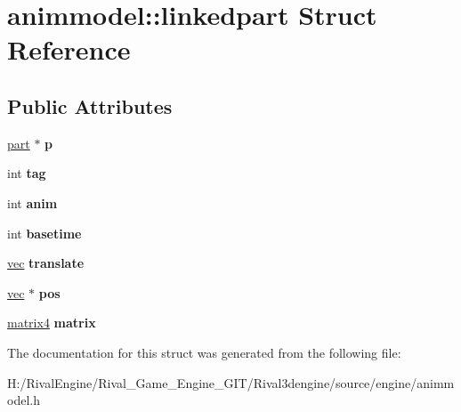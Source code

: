 \hypertarget{structanimmodel_1_1linkedpart}{}\section{animmodel\+:\+:linkedpart Struct Reference}
\label{structanimmodel_1_1linkedpart}
\subsection*{Public Attributes}
\begin{DoxyCompactItemize}
\item 
\mbox{\label{structanimmodel_1_1linkedpart_a5e61dc039b535c95bd657281d0ae76f2}} 
\hyperlink{structanimmodel_1_1part}{part} $\ast$ {\bfseries p}
\item 
\mbox{\label{structanimmodel_1_1linkedpart_a81c34c2f2b9e3b64faff64a4c9b67f8e}} 
int {\bfseries tag}
\item 
\mbox{\label{structanimmodel_1_1linkedpart_a2c4615fc73ec1401872b43f219c8e37c}} 
int {\bfseries anim}
\item 
\mbox{\label{structanimmodel_1_1linkedpart_a7d9d5de9bcee6f7391dd4df11bda7492}} 
int {\bfseries basetime}
\item 
\mbox{\label{structanimmodel_1_1linkedpart_a1c0e415757bb9d7f240ab022ac5f74f7}} 
\hyperlink{structvec}{vec} {\bfseries translate}
\item 
\mbox{\label{structanimmodel_1_1linkedpart_a00d5420c2f0e749c4ed054a5bb4ccc1f}} 
\hyperlink{structvec}{vec} $\ast$ {\bfseries pos}
\item 
\mbox{\label{structanimmodel_1_1linkedpart_a957379fa0689c9d9c064e493d7e34585}} 
\hyperlink{structmatrix4}{matrix4} {\bfseries matrix}
\end{DoxyCompactItemize}


The documentation for this struct was generated from the following file\+:\begin{DoxyCompactItemize}
\item 
H\+:/\+Rival\+Engine/\+Rival\+\_\+\+Game\+\_\+\+Engine\+\_\+\+G\+I\+T/\+Rival3dengine/source/engine/animmodel.\+h\end{DoxyCompactItemize}
